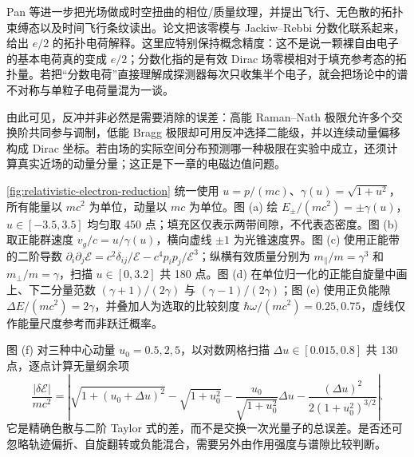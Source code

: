 Pan 等进一步把光场做成时空扭曲的相位/质量纹理，并提出飞行、无色散的拓扑束缚态以及时间飞行条纹读出。论文把该零模与 Jackiw--Rebbi 分数化联系起来，给出 $e/2$ 的拓扑电荷解释。这里应特别保持概念精度：这不是说一颗裸自由电子的基本电荷真的变成 $e/2$；分数化指的是有效 Dirac 场零模相对于填充参考态的拓扑量。若把“分数电荷”直接理解成探测器每次只收集半个电子，就会把场论中的谱不对称与单粒子电荷量混为一谈。

由此可见，反冲并非必然是需要消除的误差：高能 Raman--Nath 极限允许多个交换阶共同参与调制，低能 Bragg 极限却可用反冲选择二能级，并以连续动量偏移构成 Dirac 坐标。若由场的实际空间分布预测哪一种极限在实验中成立，还须计算真实近场的动量分量；这正是下一章的电磁边值问题。


\par\medskip
\cref{fig:relativistic-electron-reduction} 统一使用 $u=p/(mc)$、$\gamma(u)=\sqrt{1+u^2}$，所有能量以 $mc^2$ 为单位，动量以 $mc$ 为单位。图 (a) 绘 $E_\pm/(mc^2)=\pm\gamma(u)$，$u\in[-3.5,3.5]$ 均匀取 450 点；填充区仅表示两带间隙，不代表态密度。图 (b) 取正能群速度 $v_g/c=u/\gamma(u)$，横向虚线 $\pm1$ 为光锥速度界。图 (c) 使用正能带的二阶导数 $\partial_i\partial_j\mathcal E=c^2\delta_{ij}/\mathcal E-c^4p_ip_j/\mathcal E^3$；纵横有效质量分别为 $m_\parallel/m=\gamma^3$ 和 $m_\perp/m=\gamma$，扫描 $u\in[0,3.2]$ 共 180 点。图 (d) 在单位归一化的正能自旋量中画上、下二分量范数 $(\gamma+1)/(2\gamma)$ 与 $(\gamma-1)/(2\gamma)$；图 (e) 使用正负能隙 $\Delta E/(mc^2)=2\gamma$，并叠加人为选取的比较刻度 $\hbar\omega/(mc^2)=0.25,0.75$，虚线仅作能量尺度参考而非跃迁概率。

图 (f) 对三种中心动量 $u_0=0.5,2,5$，以对数网格扫描 $\Delta u\in[0.015,0.8]$ 共 130 点，逐点计算无量纲余项
\[
\frac{|\delta\mathcal E|}{mc^2}=\left|\sqrt{1+(u_0+\Delta u)^2}-\sqrt{1+u_0^2}-\frac{u_0}{\sqrt{1+u_0^2}}\Delta u-\frac{(\Delta u)^2}{2(1+u_0^2)^{3/2}}\right|.
\]
它是精确色散与二阶 Taylor 式的差，而不是交换一次光量子的总误差。是否还可忽略轨迹偏折、自旋翻转或负能混合，需要另外由作用强度与谱隙比较判断。
